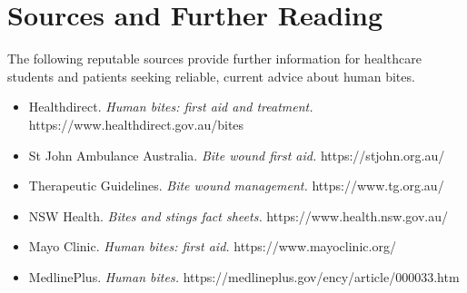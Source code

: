 \section*{Sources and Further Reading}
The following reputable sources provide further information for healthcare students and patients seeking reliable, current advice about human bites.

\begin{itemize}
    \item Healthdirect. \textit{Human bites: first aid and treatment.} https://www.healthdirect.gov.au/bites
    \item St John Ambulance Australia. \textit{Bite wound first aid.} https://stjohn.org.au/
    \item Therapeutic Guidelines. \textit{Bite wound management.} https://www.tg.org.au/
    \item NSW Health. \textit{Bites and stings fact sheets.} https://www.health.nsw.gov.au/
    \item Mayo Clinic. \textit{Human bites: first aid.} https://www.mayoclinic.org/
    \item MedlinePlus. \textit{Human bites.} https://medlineplus.gov/ency/article/000033.htm
\end{itemize}
